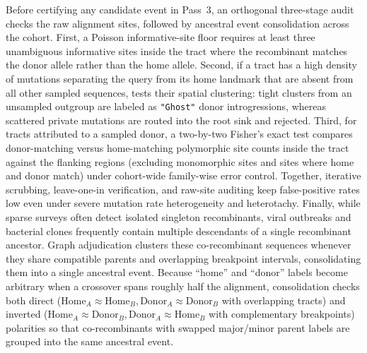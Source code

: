 Before certifying any candidate event in Pass~3, an orthogonal three-stage audit checks the raw alignment sites, followed by ancestral event consolidation across the cohort. First, a Poisson informative-site floor requires at least three unambiguous informative sites inside the tract where the recombinant matches the donor allele rather than the home allele. Second, if a tract has a high density of mutations separating the query from its home landmark that are absent from all other sampled sequences, \RhizAeon tests their spatial clustering: tight clusters from an unsampled outgroup are labeled as \texttt{"Ghost"} donor introgressions, whereas scattered private mutations are routed into the root sink and rejected. Third, for tracts attributed to a sampled donor, a two-by-two Fisher's exact test compares donor-matching versus home-matching polymorphic site counts inside the tract against the flanking regions (excluding monomorphic sites and sites where home and donor match) under cohort-wide family-wise error control. Together, iterative scrubbing, leave-one-in verification, and raw-site auditing keep false-positive rates low even under severe mutation rate heterogeneity and heterotachy. Finally, while sparse surveys often detect isolated singleton recombinants, viral outbreaks and bacterial clones frequently contain multiple descendants of a single recombinant ancestor. Graph adjudication clusters these co-recombinant sequences whenever they share compatible parents and overlapping breakpoint intervals, consolidating them into a single ancestral event. Because ``home'' and ``donor'' labels become arbitrary when a crossover spans roughly half the alignment, consolidation checks both direct ($\text{Home}_A \approx \text{Home}_B, \text{Donor}_A \approx \text{Donor}_B$ with overlapping tracts) and inverted ($\text{Home}_A \approx \text{Donor}_B, \text{Donor}_A \approx \text{Home}_B$ with complementary breakpoints) polarities so that co-recombinants with swapped major/minor parent labels are grouped into the same ancestral event.

